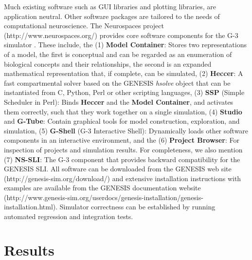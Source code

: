 \documentclass[10pt]{article}
\begin{document}
Much existing software such as GUI libraries and plotting libraries,
are application neutral.  Other software packages are tailored to the
needs of computational neuroscience.  The Neurospaces project
(http://www.neurospaces.org/) provides core software components for the
G-3 simulator \cite{cornelis03:_neuros}. These include, the (1) {\bf
  Model Container}: Stores two representations of a model, the first
is conceptual and can be regarded as an enumeration of biological
concepts and their relationships, the second is an expanded
mathematical representation that, if complete, can be simulated, (2)
{\bf Heccer}: A fast compartmental solver based on the GENESIS {\it
  hsolve} object that can be instantiated from C, Python, Perl or
other scripting languages, (3) {\bf SSP} (Simple Scheduler in Perl):
Binds {\bf Heccer} and the {\bf Model Container}, and activates them
correctly, such that they work together on a single simulation, (4)
{\bf Studio} and {\bf G-Tube}: Contain graphical tools for model
construction, exploration, and simulation, (5) {\bf G-Shell} (G-3
Interactive Shell): Dynamically loads other software components in an
interactive environment, and the (6) {\bf Project Browser}: For
inspection of projects and simulation results. For completeness, we
also mention (7) {\bf NS-SLI}: The G-3 component that provides
backward compatibility for the GENESIS SLI. All software can be
downloaded from the GENESIS web site
(http://genesis-sim.org/download/) and extensive installation
instructions with examples are available from the GENESIS
documentation website
(http://www.genesis-sim.org/userdocs/genesis-installation/genesis-installation.html).
Simulator correctness can be established by running automated
regression and integration tests.



\section*{Results}
\end{document}

